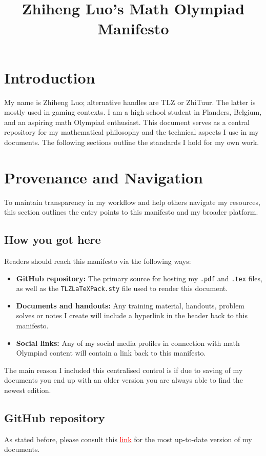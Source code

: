 \documentclass{article}
\title{Zhiheng Luo's Math Olympiad Manifesto}
\author{\TLZFullAuthor}
\begin{document}
\maketitle

\newpage
\section{Introduction}
My name is Zhiheng Luo; alternative handles are TLZ or ZhiTuur. The latter is mostly used in gaming contexts.
I am a high school student in Flanders, Belgium, and an aspiring math Olympiad enthusiast.
This document serves as a central repository for my mathematical philosophy and the technical aspects I use in my documents.
The following sections outline the standards I hold for my own work.

\section{Provenance and Navigation}

To maintain transparency in my workflow and help others navigate my resources, this section outlines the entry points to this manifesto and my broader platform.

\subsection{How you got here}
Readers should reach this manifesto via the following ways:
\begin{itemize}
    \item \textbf{GitHub repository:} The primary source for hosting my \texttt{.pdf} and \texttt{.tex} files, as well as the \texttt{TLZLaTeXPack.sty} file used to render this document.
    \item \textbf{Documents and handouts:} Any training material, handouts, problem solves or notes I create will include a hyperlink in the header back to this manifesto.
    \item \textbf{Social links:} Any of my social media profiles in connection with math Olympiad content will contain a link back to this manifesto.
\end{itemize}
The main reason I included this centralised control is if due to saving of my documents you end up with an older version you are always able to find the newest edition.

\subsection{GitHub repository}
As stated before, please consult this \href{https://github.com/ZhiTuur}{\textcolor{red}{link}} for the most up-to-date version of my documents.
\end{document}
